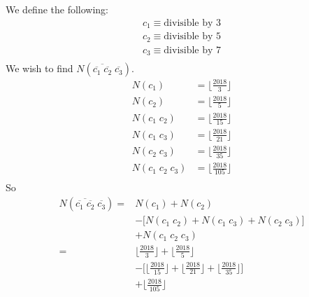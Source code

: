 \documentclass{article}
\begin{document}
\section{} %
We define the following:
\begin{align*}
	c_1\equiv\text{divisible by 3}\\
	c_2\equiv\text{divisible by 5}\\
	c_3\equiv\text{divisible by 7}\\
\end{align*}
We wish to find $N(\overline{{\overline{c_1}\;\overline{c_2}}}\;\overline{c_3})$.
\begin{align*}
	N(c_1)&=\bigg\lfloor\frac{2018}{3}\bigg\rfloor\\
	N(c_2)&=\bigg\lfloor\frac{2018}{5}\bigg\rfloor\\
	N(c_1\;c_2)&=\bigg\lfloor\frac{2018}{15}\bigg\rfloor\\
	N(c_1\;c_3)&=\bigg\lfloor\frac{2018}{21}\bigg\rfloor\\
	N(c_2\;c_3)&=\bigg\lfloor\frac{2018}{35}\bigg\rfloor\\
	N(c_1\;c_2\;c_3)&=\bigg\lfloor\frac{2018}{105}\bigg\rfloor\\
\end{align*}
So
\begin{align*}
	N(\overline{{\overline{c_1}\;\overline{c_2}}}\;\overline{c_3})
	=&N(c_1)+N(c_2)\\
	&-\bigg[N(c_1\;c_2)+N(c_1\;c_3)+N(c_2\;c_3)\bigg]\\
	&+N(c_1\;c_2\;c_3)\\
	=&\bigg\lfloor\frac{2018}{3}\bigg\rfloor
	+\bigg\lfloor\frac{2018}{5}\bigg\rfloor\\
	&-\Bigg[\bigg\lfloor\frac{2018}{15}\bigg\rfloor
	+\bigg\lfloor\frac{2018}{21}\bigg\rfloor
	+\bigg\lfloor\frac{2018}{35}\bigg\rfloor\Bigg]\\
	&+\bigg\lfloor\frac{2018}{105}\bigg\rfloor\\
\end{align*}
\section{} %
\end{document}
